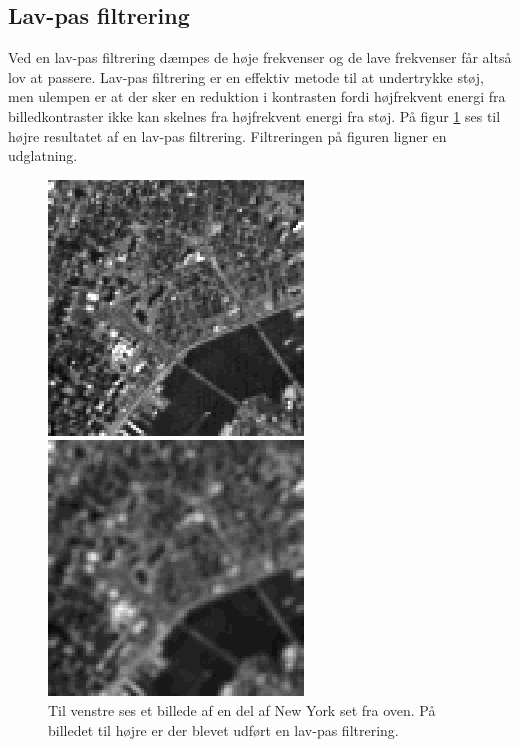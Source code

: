 \subsection{Lav-pas filtrering}
Ved en lav-pas filtrering dæmpes de høje frekvenser og de lave frekvenser får altså lov at passere. Lav-pas filtrering er en effektiv metode til at undertrykke støj, men ulempen er at der sker en reduktion i kontrasten fordi højfrekvent energi fra billedkontraster ikke kan skelnes fra højfrekvent energi fra støj. På figur \ref{fig:low_pass} ses til højre resultatet af en lav-pas filtrering. Filtreringen på figuren ligner en udglatning.
\begin{figure}[H]
	\begin{minipage}[b]{0.5\linewidth}
		\centering
		\includegraphics[scale=0.5]{files/bildbeh/img/new_york.jpg}
	\end{minipage}
	\hspace{0.5cm}
	\begin{minipage}[b]{0.5\linewidth}
		\centering
		\includegraphics[scale=0.5]{files/bildbeh/img/lowpass.jpg}
	\end{minipage}
	\caption{Til venstre ses et billede af en del af New York set fra oven. På billedet til højre er der blevet udført en lav-pas filtrering.\label{fig:low_pass}}
\end{figure}


